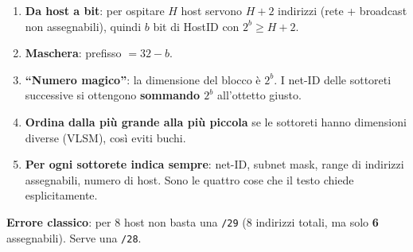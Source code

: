 \documentclass[12pt, a4paper]{article}
\begin{document}
\begin{tcolorbox}[colback=lightergray!10, colframe=tocsec, title=\textbf{Procedura in 5 passi}]
\begin{enumerate}
    \item \textbf{Da host a bit}: per ospitare $H$ host servono $H+2$ indirizzi (rete + broadcast non assegnabili), quindi $b$ bit di HostID con $2^b \geq H+2$.
    \item \textbf{Maschera}: prefisso $= 32 - b$.
    \item \textbf{``Numero magico''}: la dimensione del blocco è $2^b$. I net-ID delle sottoreti successive si ottengono \textbf{sommando $2^b$} all'ottetto giusto.
    \item \textbf{Ordina dalla più grande alla più piccola} se le sottoreti hanno dimensioni diverse (VLSM), così eviti buchi.
    \item \textbf{Per ogni sottorete indica sempre}: net-ID, subnet mask, range di indirizzi assegnabili, numero di host. Sono le quattro cose che il testo chiede esplicitamente.
\end{enumerate}
\textcolor{red!70!black}{\textbf{Errore classico}}: per 8 host non basta una \texttt{/29} ($8$ indirizzi totali, ma solo \textbf{6} assegnabili). Serve una \texttt{/28}.
\end{tcolorbox}
\end{document}

